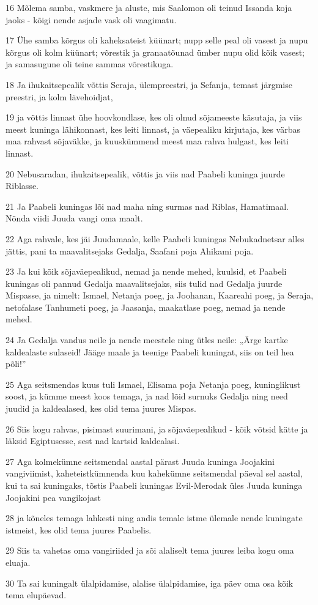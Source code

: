 \par 16 Mõlema samba, vaskmere ja aluste, mis Saalomon oli teinud Issanda koja jaoks - kõigi nende asjade vask oli vaagimatu.
\par 17 Ühe samba kõrgus oli kaheksateist küünart; nupp selle peal oli vasest ja nupu kõrgus oli kolm küünart; võrestik ja granaatõunad ümber nupu olid kõik vasest; ja samasugune oli teine sammas võrestikuga.
\par 18 Ja ihukaitsepealik võttis Seraja, ülempreestri, ja Sefanja, temast järgmise preestri, ja kolm lävehoidjat,
\par 19 ja võttis linnast ühe hoovkondlase, kes oli olnud sõjameeste käsutaja, ja viis meest kuninga lähikonnast, kes leiti linnast, ja väepealiku kirjutaja, kes värbas maa rahvast sõjaväkke, ja kuuskümmend meest maa rahva hulgast, kes leiti linnast.
\par 20 Nebusaradan, ihukaitsepealik, võttis ja viis nad Paabeli kuninga juurde Riblasse.
\par 21 Ja Paabeli kuningas lõi nad maha ning surmas nad Riblas, Hamatimaal. Nõnda viidi Juuda vangi oma maalt.
\par 22 Aga rahvale, kes jäi Juudamaale, kelle Paabeli kuningas Nebukadnetsar alles jättis, pani ta maavalitsejaks Gedalja, Saafani poja Ahikami poja.
\par 23 Ja kui kõik sõjaväepealikud, nemad ja nende mehed, kuulsid, et Paabeli kuningas oli pannud Gedalja maavalitsejaks, siis tulid nad Gedalja juurde Mispasse, ja nimelt: Ismael, Netanja poeg, ja Joohanan, Kaareahi poeg, ja Seraja, netofalase Tanhumeti poeg, ja Jaasanja, maakatlase poeg, nemad ja nende mehed.
\par 24 Ja Gedalja vandus neile ja nende meestele ning ütles neile: „Ärge kartke kaldealaste sulaseid! Jääge maale ja teenige Paabeli kuningat, siis on teil hea põli!”
\par 25 Aga seitsmendas kuus tuli Ismael, Elisama poja Netanja poeg, kuninglikust soost, ja kümme meest koos temaga, ja nad lõid surnuks Gedalja ning need juudid ja kaldealased, kes olid tema juures Mispas.
\par 26 Siis kogu rahvas, pisimast suurimani, ja sõjaväepealikud - kõik võtsid kätte ja läksid Egiptusesse, sest nad kartsid kaldealasi.
\par 27 Aga kolmekümne seitsmendal aastal pärast Juuda kuninga Joojakini vangiviimist, kaheteistkümnenda kuu kahekümne seitsmendal päeval sel aastal, kui ta sai kuningaks, tõstis Paabeli kuningas Evil-Merodak üles Juuda kuninga Joojakini pea vangikojast
\par 28 ja kõneles temaga lahkesti ning andis temale istme ülemale nende kuningate istmeist, kes olid tema juures Paabelis.
\par 29 Siis ta vahetas oma vangiriided ja sõi alaliselt tema juures leiba kogu oma eluaja.
\par 30 Ta sai kuningalt ülalpidamise, alalise ülalpidamise, iga päev oma osa kõik tema elupäevad.



